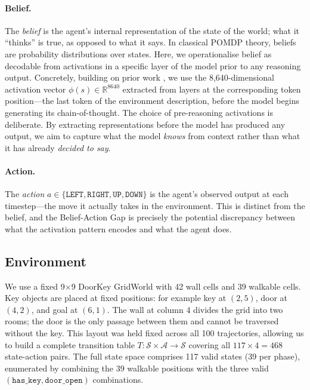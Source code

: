 \documentclass[final]{sparreport}
\begin{document}
\paragraph{Belief.} The \emph{belief} is the agent's internal 
representation of the state of the world; what it ``thinks'' is true, as opposed to what it says. In classical POMDP theory, beliefs are probability distributions over states. Here, we operationalise belief as decodable from activations in a specific layer of the model prior to any reasoning output. Concretely, building on prior work \cite{arghal2026behavioural}, we use the 8,640-dimensional activation vector $\phi(s) \in \mathbb{R}^{8640}$ extracted from layers at the corresponding token position---the last token of the 
environment description, before the model begins generating its chain-of-thought. The choice of pre-reasoning activations is deliberate. By extracting representations before the model has  produced any output, we aim to capture what the model \emph{knows} from context rather than what it has already \emph{decided to say}.

\paragraph{Action.} The \emph{action} $a \in \{\texttt{LEFT}, \texttt{RIGHT}, \texttt{UP}, \texttt{DOWN}\}$ is the agent's observed output at each timestep---the move it actually takes in the environment. This is distinct from the belief, and the Belief-Action Gap is precisely the potential discrepancy between what the activation pattern encodes and what the agent does.


\subsection{Environment}

We use a fixed 9$\times$9 DoorKey GridWorld with 42 wall cells and 39 
walkable cells. Key objects are placed at fixed positions: for example key at 
$(2, 5)$, door at $(4, 2)$, and goal at $(6, 1)$. The wall at column 4 
divides the grid into two rooms; the door is the only passage between 
them and cannot be traversed without the key. This layout was held 
fixed across all 100 trajectories, allowing us to build a complete 
transition table $T: \mathcal{S} \times \mathcal{A} \to \mathcal{S}$ 
covering all $117 \times 4 = 468$ state-action pairs. The full state 
space comprises 117 valid states (39 per phase), enumerated by 
combining the 39 walkable positions with the three valid 
$(\texttt{has\_key}, \texttt{door\_open})$ combinations.
\end{document}
